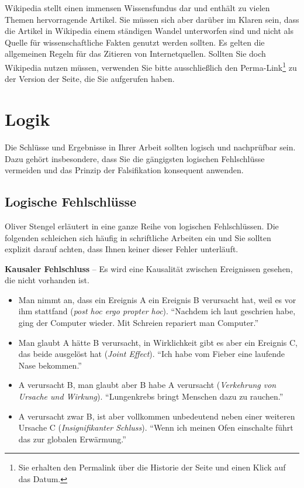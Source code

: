 \documentclass[a4paper,11pt,headings=normal]{scrartcl}
\begin{document}
Wikipedia stellt einen immensen Wissensfundus dar und enthält zu vielen Themen hervorragende Artikel. Sie müssen sich aber darüber im Klaren sein, dass die Artikel in Wikipedia einem ständigen Wandel unterworfen sind und nicht als Quelle für wissenschaftliche Fakten genutzt werden sollten. Es gelten die allgemeinen Regeln für das Zitieren von Internetquellen. Sollten Sie doch Wikipedia nutzen müssen, verwenden Sie bitte ausschließlich den Perma-Link\footnote{Sie erhalten den Permalink über die Historie der Seite und einen Klick auf das Datum.} zu der Version der Seite, die Sie aufgerufen haben.



\section{Logik}

Die Schlüsse und Ergebnisse in Ihrer Arbeit sollten logisch und nachprüfbar sein. Dazu gehört insbesondere, dass Sie die gängigsten logischen Fehlschlüsse vermeiden und das Prinzip der Falsifikation konsequent anwenden.

\subsection{Logische Fehlschlüsse}
Oliver Stengel erläutert in \cite{Stengel2005} eine ganze Reihe von logischen Fehlschlüssen. Die folgenden schleichen sich häufig in schriftliche Arbeiten ein und Sie sollten explizit darauf achten, dass Ihnen keiner dieser Fehler unterläuft.

\vspace{0.3cm}\noindent\textbf{Kausaler Fehlschluss} -- Es wird eine Kausalität zwischen Ereignissen gesehen, die nicht vorhanden ist. 
  \begin{itemize}
     \item Man nimmt an, dass ein Ereignis A ein Ereignis B verursacht hat, weil es vor ihm stattfand (\textit{post hoc ergo propter hoc}). "`Nachdem ich laut geschrien habe, ging der Computer wieder. Mit Schreien repariert man Computer."'
     \item Man glaubt A hätte B verursacht, in Wirklichkeit gibt es aber ein Ereignis C, das beide ausgelöst hat (\textit{Joint Effect}). "`Ich habe vom Fieber eine laufende Nase bekommen."'
     \item A verursacht B, man glaubt aber B habe A verursacht (\textit{Verkehrung von Ursache und Wirkung}). "`Lungenkrebs bringt Menschen dazu zu rauchen."'
     \item A verursacht zwar B, ist aber vollkommen unbedeutend neben einer weiteren Ursache C (\textit{Insignifikanter Schluss}). "`Wenn ich meinen Ofen einschalte führt das zur globalen Erwärmung."'
  \end{itemize}
\end{document}
